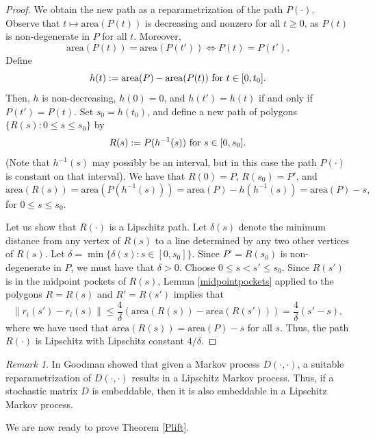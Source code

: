 \documentclass[11pt]{amsart}
\theoremstyle{remark}
\newtheorem{remark}[theorem]{Remark}
\numberwithin{equation}{section}
\newcommand{\area}{\mathrm{area}}
\renewcommand{\leq}{\leqslant}
\renewcommand{\geq}{\geqslant}
\begin{document}
\begin{proof} 
We obtain the new path as a reparametrization of the path $P(\cdot)$.
Observe that $t\mapsto \area( P(t))$ is decreasing and nonzero for all $t\geq 0$, as $ P(t)$ is  non-degenerate in $P$ for all $t$. Moreover,
\[
\area(P(t))=\area(P(t')) \Leftrightarrow P(t)=P(t').
\]
Define 
\[
h(t) := \area(P)-\area(P(t))\hbox{ for }t\in [0,t_0].
\]
Then, $h$ is non-decreasing, $h(0) = 0$, and 
$h(t') = h(t)$ if and only if  $P(t') = P(t)$. Set $s_0=h(t_0)$, and define a new path of polygons $\{R(s):0\leq s\leq s_0\}$ by
\[
 R(s) :=  P(h^{-1}(s))\hbox{ for  $s\in [0, s_0]$.} 
 \]
(Note that $h^{-1}(s)$ may possibly be an interval, but in this case the path $P(\cdot)$ is constant on that interval). We have that $R(0)=P$, $R(s_0)=P'$, and 
\begin{equation*}%
\area(R(s))= \area( P(h^{-1}(s))) = \area(P)-h(h^{-1}(s))=\area(P)-s,
\end{equation*}
for $0\leq s\leq s_0$.

Let us show that $R(\cdot)$ is a Lipschitz path. Let $\delta(s)$ denote the minimum distance
from any vertex of $R(s)$ to a line determined by any two other vertices of $R(s)$. Let $\delta=\min\{\delta(s):s\in [0,s_0]\}$.
Since $P'=R(s_0)$ is non-degenerate in $P$, we must  have that $\delta>0$. 
Choose  $0\leq s < s' \leq s_0$. Since $R(s')$ is in the midpoint pockets of $R(s)$, Lemma \ref{midpointpockets} applied to the polygons  $R=R(s)$ and $R'=R(s')$ implies that
\[
\|r_i(s')-r_i(s)\|\leq \frac{4}{\delta}(\area(R(s))-\area(R(s')))=\frac{4}{\delta}(s'-s),
\]
where we have used that $\area(R(s))=\area(P)-s$ for all $s$. Thus, the path $R(\cdot)$ is Lipschitz with Lipschitz constant $4/\delta$.
\end{proof}




\begin{remark}
In \cite{goodman} Goodman showed that given a Markov process $D(\cdot,\cdot)$, a suitable reparametrization of $D(\cdot,\cdot)$  results in a Lipschitz Markov process. Thus,  if a stochastic matrix $D$ is embeddable, then it is also embeddable in a Lipschitz Markov process. 
\end{remark}


We are now ready to prove Theorem \ref{Plift}. 
\end{document}
